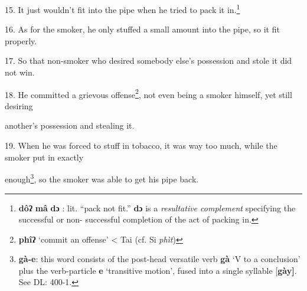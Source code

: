 15. It just wouldn't fit into the pipe when he tried to pack it in.\footnote{\textbf{dôʔ} \textbf{mâ} \textbf{dɔ} : lit. ``pack not fit.'' \textbf{dɔ} is a \textit{resultative complement }specifying the successful or non- successful completion of the act of packing in.}

16. As for the smoker, he only stuffed a small amount into the pipe, so it fit
properly.

17. So that non-smoker who desired somebody else's possession and stole it did
not win.

18. He committed a grievous offense\footnote{\textbf{phîʔ} `commit an offense' < Tai (cf. Si \textit{phìt})}, not even being a smoker himself, yet still
desiring

another's possession and stealing it.

19. When he was forced to stuff in tobacco, it was way too much, while the smoker
put in exactly

enough\footnote{\textbf{gà-e}: this word consists of the post-head versatile verb \textbf{gà} `V to a conclusion' plus the verb-particle \textbf{e} `transitive motion', fused into a single syllable [\textbf{gày]}. See DL: 400-1.}, so the smoker was able to get his pipe back.

